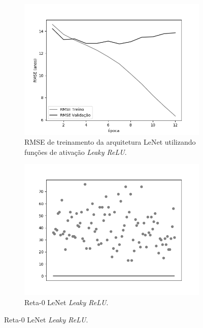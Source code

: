 \begin{figure}[hb!]
\begin{subfigure}[hb]{0.5\linewidth}
		\end{subfigure}\\
	  \begin{subfigure}[hb]{0.5\linewidth}
	    \caption{RMSE de treinamento da arquitetura LeNet utilizando funções de ativação \emph{Leaky ReLU}.}
	    \label{fig:redeneuralbiologica}
	    \includegraphics[width=\linewidth]{img/graficos/history/lenet/fig-history-image-treat-1-lenet-lrelu-rmse.png}
	  \end{subfigure}
		\begin{subfigure}[hb]{0.5\linewidth}
			\caption{Reta-0 LeNet \emph{Leaky ReLU}.}
			\label{fig:redeneuralbiologica}
		 \includegraphics[width=\linewidth]{img/graficos/reta0/lenet/fig-reta-0-image-treat-1-lenet-lrelu.png}
		\end{subfigure}%
	\end{figure}

